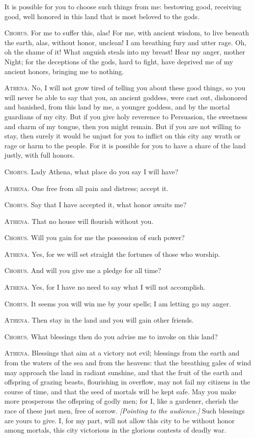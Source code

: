 \documentclass[12pt]{article}
\begin{document}
It is possible for you to choose such things from me: bestowing good, receiving good, well honored in this land that is most beloved to the gods.

\textsc{Chorus.} For me to suffer this, alas! For me, with ancient wisdom, to live beneath the earth, alas, without honor, unclean! I am breathing fury and utter rage. Oh, oh the shame of it! What anguish steals into my breast! Hear my anger, mother Night; for the deceptions of the gods, hard to fight, have deprived me of my ancient honors, bringing me to nothing.

\textsc{Athena.} No, I will not grow tired of telling you about these good things, so you will never be able to say that you, an ancient goddess, were cast out, dishonored and banished, from this land by me, a younger goddess, and by the mortal guardians of my city. But if you give holy reverence to Persuasion, the sweetness and charm of my tongue, then you might remain. But if you are not willing to stay, then surely it would be unjust for you to inflict on this city any wrath or rage or harm to the people. For it is possible for you to have a share of the land justly, with full honors.

\textsc{Chorus.} Lady Athena, what place do you say I will have?

\textsc{Athena.} One free from all pain and distress; accept it.

\textsc{Chorus.} Say that I have accepted it, what honor awaits me?

\textsc{Athena.} That no house will flourish without you.

\textsc{Chorus.} Will you gain for me the possession of such power?

\textsc{Athena.} Yes, for we will set straight the fortunes of those who worship.

\textsc{Chorus.} And will you give me a pledge for all time?

\textsc{Athena.} Yes, for I have no need to say what I will not accomplish.

\textsc{Chorus.} It seems you will win me by your spells; I am letting go my anger.

\textsc{Athena.} Then stay in the land and you will gain other friends.

\textsc{Chorus.} What blessings then do you advise me to invoke on this land?

\textsc{Athena.} Blessings that aim at a victory not evil; blessings from the earth and from the waters of the sea and from the heavens: that the breathing gales of wind may approach the land in radiant sunshine, and that the fruit of the earth and offspring of grazing beasts, flourishing in overflow, may not fail my citizens in the course of time, and that the seed of mortals will be kept safe. May you make more prosperous the offspring of godly men; for I, like a gardener, cherish the race of these just men, free of sorrow. \textit{[Pointing to the audience.]} Such blessings are yours to give. I, for my part, will not allow this city to be without honor among mortals, this city victorious in the glorious contests of deadly war.
\end{document}
